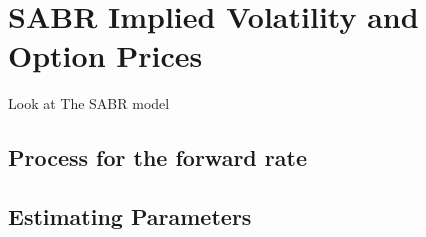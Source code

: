 \section{SABR Implied Volatility and Option Prices}

Look at The SABR model 

\subsection{Process for the forward rate}

\subsection{Estimating Parameters}